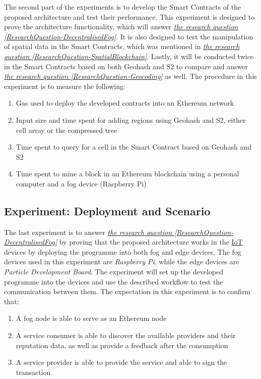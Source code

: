 \npara The second part of the experiments is to develop the Smart Contracts of the proposed architecture and test their performance.
This experiment is designed to prove the architecture functionality, which will answer \hyperref[ResearchQuestion-DecentralisedFog]{\textit{the research question \ref{ResearchQuestion-DecentralisedFog}}}.
It is also designed to test the manipulation of spatial data in the Smart Contracts, which was mentioned in \hyperref[ResearchQuestion-SpatialBlockchain]{\textit{the research question \ref{ResearchQuestion-SpatialBlockchain}}}.
Lastly, it will be conducted twice in the Smart Contracts based on both Geohash and S2 to compare and answer \hyperref[ResearchQuestion-Geocoding]{\textit{the research question \ref{ResearchQuestion-Geocoding}}} as well.
The procedure in this experiment is to measure the following:
\begin{enumerate}
  \item Gas used to deploy the developed contracts into an Ethereum network
  \item Input size and time spent for adding regions using Geohash and S2, either cell array or the compressed tree
  \item Time spent to query for a cell in the Smart Contract based on Geohash and S2
  \item Time spent to mine a block in an Ethereum blockchain using a personal computer and a fog device (Raspberry Pi)
\end{enumerate}

\subsection{Experiment: Deployment and Scenario} \label{Methodology-ExperimentDesign-Deployment}

\npara The last experiment is to answer \hyperref[ResearchQuestion-DecentralisedFog]{\textit{the research question \ref{ResearchQuestion-DecentralisedFog}}} by proving that the proposed architecture works in the \hyperref[Acronym-IoT]{IoT} devices by deploying the programme into both fog and edge devices.
The fog devices used in this experiment are \textit{Raspberry Pi}, while the edge devices are \textit{Particle Development Board}.
The experiment will set up the developed programme into the devices and use the described workflow to test the communication between them.
The expectation in this experiment is to confirm that:
\begin{enumerate}
  \item A fog node is able to serve as an Ethereum node
  \item A service consumer is able to discover the available providers and their reputation data, as well as provide a feedback after the consumption
  \item A service provider is able to provide the service and able to sign the transaction
\end{enumerate}
